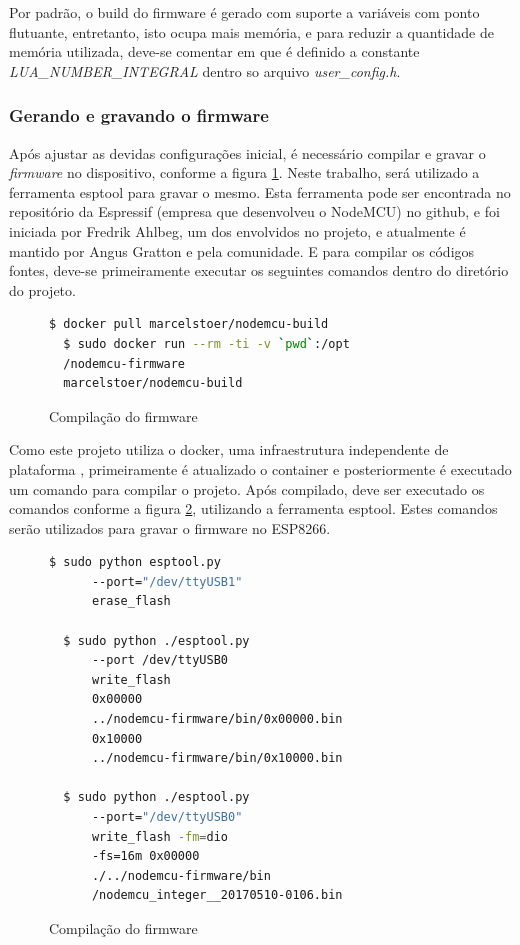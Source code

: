 \documentclass[journal]{IEEEtran}
\begin{document}
Por padrão, o build do firmware é gerado com suporte a variáveis com ponto flutuante, entretanto, isto ocupa mais memória, e para reduzir a quantidade de memória utilizada, deve-se comentar em que é definido a constante \emph{LUA\_NUMBER\_INTEGRAL} dentro so arquivo \emph{user\_config.h}.

\subsubsection{Gerando e gravando o firmware}

Após ajustar as devidas configurações inicial, é necessário compilar e gravar o \emph{firmware} no dispositivo, conforme a figura \ref{alg:dockerpull}. Neste trabalho, será utilizado a ferramenta esptool para gravar o mesmo. Esta ferramenta pode ser encontrada no repositório da Espressif (empresa que desenvolveu o NodeMCU) no github, e foi iniciada por Fredrik Ahlbeg, um dos envolvidos no projeto, e atualmente é mantido por Angus Gratton e pela comunidade. E para compilar os códigos fontes, deve-se primeiramente executar os seguintes comandos dentro do diretório do projeto.

\begin{figure}[h]
\centering

\begin{lstlisting}[language=bash]
  $ docker pull marcelstoer/nodemcu-build
  $ sudo docker run --rm -ti -v `pwd`:/opt
  /nodemcu-firmware 
  marcelstoer/nodemcu-build
\end{lstlisting}

\caption{Compilação do firmware}
\label{alg:dockerpull}
\end{figure}


Como este projeto utiliza o docker, uma infraestrutura independente de plataforma \cite{dockeroque}, primeiramente é atualizado o container e posteriormente é executado um comando para compilar o projeto. 
Após compilado, deve ser executado os comandos conforme a figura \ref{alg:esptool1}, utilizando a ferramenta esptool. Estes comandos serão utilizados para gravar o firmware no ESP8266. 


\begin{figure}[H]
\centering

\begin{lstlisting}[language=bash]
  $ sudo python esptool.py 
      --port="/dev/ttyUSB1" 
      erase_flash

  $ sudo python ./esptool.py 
      --port /dev/ttyUSB0 
      write_flash 
      0x00000 
      ../nodemcu-firmware/bin/0x00000.bin 
      0x10000 
      ../nodemcu-firmware/bin/0x10000.bin

  $ sudo python ./esptool.py 
      --port="/dev/ttyUSB0" 
      write_flash -fm=dio 
      -fs=16m 0x00000 
      ./../nodemcu-firmware/bin
      /nodemcu_integer__20170510-0106.bin
\end{lstlisting}

\caption{Compilação do firmware}
\label{alg:esptool1}
\end{figure}
\end{document}
